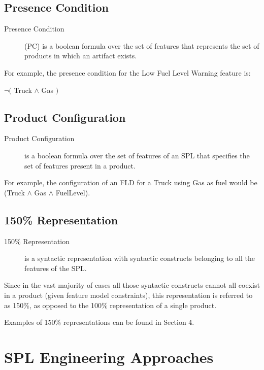 \documentclass[11pt]{article}
\begin{document}
\subsection{Presence Condition}

\begin{description}

\item[Presence Condition]
(PC) is a boolean formula over the set of features that represents the set of products in which an artifact exists.
\end{description}

For example, the presence condition for the Low Fuel Level Warning feature is: 

$\neg ($ Truck $\wedge$ Gas $)$

\subsection{Product Configuration}

\begin{description}

\item[Product Configuration]
is a boolean formula over the set of features of an SPL that specifies the set of features present in a product.
\end{description}

For example, the configuration of an FLD for a Truck using Gas as fuel would be (Truck $\wedge$ Gas $\wedge$ FuelLevel).

\subsection{150\% Representation}

\begin{description}

\item[150\% Representation]
is a syntactic representation with syntactic constructs belonging to all the features of the SPL. 
\end{description}

Since in the vast majority of cases all those syntactic constructs cannot all coexist in a product (given feature model constraints), this representation is referred to as 150\%, as opposed to the 100\% representation of a single product.

Examples of 150\% representations can be found in Section 4.

\section{SPL Engineering Approaches}
\end{document}
